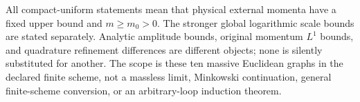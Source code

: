 All compact-uniform statements mean that physical external momenta have a
fixed upper bound and $m\ge m_0>0$. The stronger global logarithmic scale
bounds are stated separately. Analytic amplitude bounds, original momentum
$L^1$ bounds, and quadrature refinement differences are different objects;
none is silently substituted for another. The scope is these ten massive
Euclidean graphs in the declared finite scheme, not a massless limit,
Minkowski continuation, general finite-scheme conversion, or an arbitrary-loop
induction theorem.
